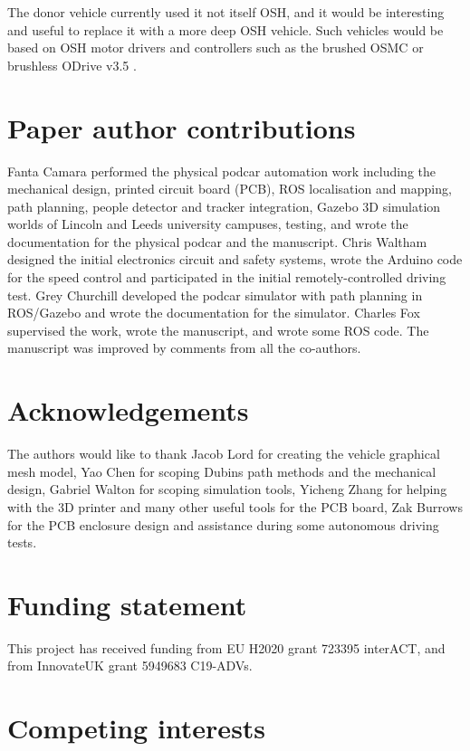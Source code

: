 \documentclass[a4paper]{article}
\begin{document}
	The donor vehicle currently used it not itself OSH, and it would be interesting and useful to replace it with a more deep OSH vehicle.   Such vehicles would be based on OSH motor drivers and controllers such as the brushed OSMC \cite{robotpoweropen} or brushless ODrive v3.5  \cite{oriveroboticsodrive}.
	
	
	\section*{Paper author contributions}\label{h.fy8hbipy6kwe}
	
	Fanta Camara performed the physical podcar automation work including the mechanical design, printed circuit board (PCB), ROS localisation and mapping, path planning, people detector and tracker integration, Gazebo 3D simulation worlds of Lincoln and Leeds university campuses, testing, and wrote the documentation for the physical podcar and  the manuscript. Chris Waltham designed the initial electronics circuit and safety systems, wrote the Arduino code for the speed control and participated in the initial remotely-controlled driving test. Grey Churchill developed the podcar simulator with path planning in ROS/Gazebo and wrote the documentation for the simulator. Charles Fox supervised the work, wrote the manuscript, and wrote some ROS code. The manuscript was improved by comments from all the co-authors.
	
	
	\section*{Acknowledgements}\label{h.gu3yyarx72d6}
	
	The authors would like to thank Jacob Lord for creating the vehicle graphical mesh model, Yao Chen for scoping Dubins path methods and the mechanical design, Gabriel Walton for scoping simulation tools, Yicheng Zhang for helping with the 3D printer and many other useful tools for the PCB board, Zak Burrows for the PCB enclosure design and assistance during some autonomous driving tests.
	
	
	\section*{Funding statement}\label{h.4u1a7tugh2om}
	
	This project has received funding from EU H2020 grant 723395 interACT, and from InnovateUK  grant 5949683 C19-ADVs.
	
	
	\section*{Competing interests}\label{h.q1j1rznb43fl}
	
\end{document}
